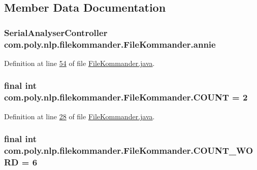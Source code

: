 \subsection{Member Data Documentation}
\hypertarget{classcom_1_1poly_1_1nlp_1_1filekommander_1_1_file_kommander_a5c3ff51dc7f068e9442618b7c2ab1810}{
\subsubsection[{annie}]{\setlength{\rightskip}{0pt plus 5cm}Serial\-Analyser\-Controller com.\-poly.\-nlp.\-filekommander.\-File\-Kommander.\-annie\hspace{0.3cm}{\ttfamily [private]}}}\label{classcom_1_1poly_1_1nlp_1_1filekommander_1_1_file_kommander_a5c3ff51dc7f068e9442618b7c2ab1810}


Definition at line \hyperlink{L54}{54} of file \hyperlink{}{File\-Kommander.\-java}.

\hypertarget{classcom_1_1poly_1_1nlp_1_1filekommander_1_1_file_kommander_ae3f898b3eba16a0ea7fde82bc1bb8352}{
\subsubsection[{C\-O\-U\-N\-T}]{\setlength{\rightskip}{0pt plus 5cm}final int com.\-poly.\-nlp.\-filekommander.\-File\-Kommander.\-C\-O\-U\-N\-T = 2\hspace{0.3cm}{\ttfamily [static]}}}\label{classcom_1_1poly_1_1nlp_1_1filekommander_1_1_file_kommander_ae3f898b3eba16a0ea7fde82bc1bb8352}


Definition at line \hyperlink{L28}{28} of file \hyperlink{}{File\-Kommander.\-java}.

\hypertarget{classcom_1_1poly_1_1nlp_1_1filekommander_1_1_file_kommander_a1c18ad75cdd0b8963695c1a8fd378b9c}{
\subsubsection[{C\-O\-U\-N\-T\-\_\-\-W\-O\-R\-D}]{\setlength{\rightskip}{0pt plus 5cm}final int com.\-poly.\-nlp.\-filekommander.\-File\-Kommander.\-C\-O\-U\-N\-T\-\_\-\-W\-O\-R\-D = 6\hspace{0.3cm}{\ttfamily [static]}}}\label{classcom_1_1poly_1_1nlp_1_1filekommander_1_1_file_kommander_a1c18ad75cdd0b8963695c1a8fd378b9c}



